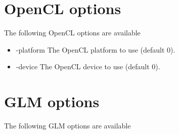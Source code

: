 \section{OpenCL options}

The following OpenCL options are available

\begin{itemize}

\item -platform
\newline \newline The OpenCL platform to use (default 0).

\item -device
\newline \newline The OpenCL device to use (default 0).

\end{itemize}

\section{GLM options}

The following GLM options are available


